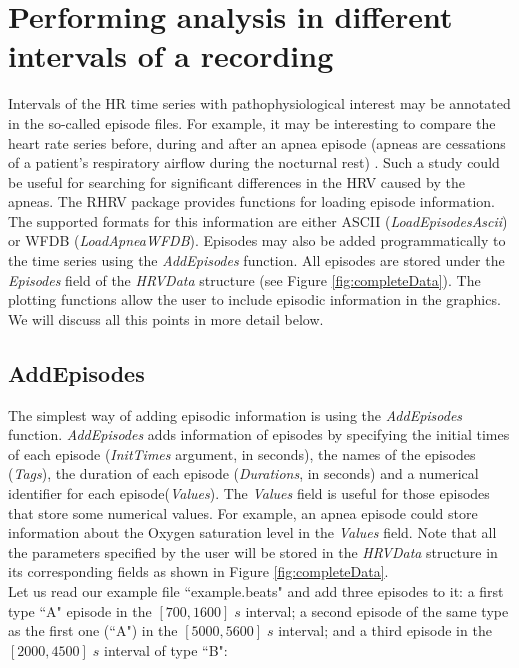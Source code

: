 \documentclass[12pt,lot, lof]{puthesis}
\begin{document}
\section{Performing analysis in different intervals of a recording\label{sec:episodeInformations}}
Intervals of the \gls{HR} time series with pathophysiological interest may be 
annotated in the so-called episode files. For example, it may be interesting to 
compare the heart rate series before, during and after an apnea episode (apneas 
are cessations of a patient's respiratory airflow during the nocturnal rest) 
\cite{lado2012nocturnal}. Such a study could be useful for searching for 
significant differences
in the HRV caused by the apneas. The RHRV package provides functions for 
loading episode information. The supported formats for this information are 
either ASCII (\textit{LoadEpisodesAscii}) or
WFDB (\textit{LoadApneaWFDB}). Episodes may also be added programmatically to 
the time series using the \textit{AddEpisodes} function. All episodes are 
stored under the \textit{Episodes} field of the \textit{HRVData} structure (see 
Figure \ref{fig:completeData}). The plotting functions allow the user to 
include episodic information in the graphics. We will discuss all this points 
in more detail below.\\
\subsection{AddEpisodes\label{par:AddEpisodes}} The simplest way of adding 
episodic information is using the \textit{AddEpisodes} function. 
\textit{AddEpisodes} adds information of episodes by specifying the initial 
times of each episode (\textit{InitTimes} argument, in seconds), the names of 
the episodes (\textit{Tags}), the duration of each episode (\textit{Durations}, 
in seconds) and a numerical identifier for each episode(\textit{Values}). The 
\textit{Values} field is useful for those episodes
that store some numerical values. For example, an apnea episode could store 
information
about the Oxygen saturation level in the \textit{Values} field. Note that all 
the parameters specified by the user will be stored in the \textit{HRVData} 
structure in its corresponding fields as shown in Figure 
\ref{fig:completeData}.\\

Let us read our example file ``example.beats" and add three episodes to it: a 
first type ``A" episode in the $[700,1600]\;s$ interval; a second episode of 
the same type as the first one (``A") in the $[5000,5600]\;s$ interval; and a 
third episode in the $[2000,4500]\;s$ interval of type ``B":
\end{document}
